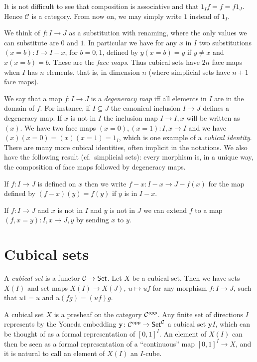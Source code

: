 \documentclass[10pt,a4paper]{article}
\newcommand{\CC}{{\mathcal C}}
\newcommand{\yoneda}{\mathbf{y}}
\begin{document}
It is not difficult to see that composition is associative and that $1_I f = f = f 1_J$.
Hence $\CC$ is a category. From now on, we may simply write $1$ instead of $1_I$.

 We think of $f:I\to J$ as a substitution with renaming,
 where the only values we can substitute are $0$ and $1$.
In particular we have for any $x$ in $I$ two substitutions $(x=b):I\to I-x$, for $b=0,1$,
defined by $y(x=b) = y$ if $y\neq x$ and $x(x=b) = b$. These are the \emph{face maps}.
Thus cubical sets have $2n$ face maps when $I$ has $n$ elements, that is, in dimension $n$
(where simplicial sets have $n+1$ face maps).

 We say that a map $f:I\to J$ is a {\em degeneracy map} iff all elements in $I$ are in
the domain of $f$. For instance, if $I\subseteq J$ the canonical inclusion $I \to J$ defines
a degeneracy map. If $x$ is not in $I$ the inclusion map $I \to I,x$ will be written as $(x)$.
We have two face maps $(x=0), (x=1):I,x\to I$ and we
have $(x)(x=0) = (x)(x=1) = 1_I$, which is one example of a \emph{cubical identity}.
There are many more cubical identities, often implicit in the notations. We also have
the following result (cf.\ simplicial sets): every morphism is, in a unique way, the composition of
face maps followed by degeneracy maps.

 If $f:I\to J$ is defined on $x$ then we write $f-x:I-x \to J-{f(x)}$ for the map defined by
$(f-x)(y) = f(y)$ if $y$ is in $I-x.$

 If $f:I\to J$ and $x$ is not in $I$ and $y$ is not in $J$ we can extend $f$ to a map
$(f,x=y):I,x\to J,y$ by sending $x$ to $y$.

\section{Cubical sets}

A \emph{cubical set} is a functor $\CC\to{\sf Set}$.
Let $X$ be a cubical set. Then we have sets $X(I)$ and set maps
$X(I)\to X(J),~u\longmapsto uf$ for any morphism $f:I\to J$,
such that $u1 = u$ and $u(fg) = (uf)g$.

\medskip

A cubical set $X$ is a presheaf on the category ${\cal C}^{opp}$. Any
finite set of directions $I$ represents by the Yoneda embedding
$\yoneda \colon {\cal C}^{opp} \to {\sf Set}^{\cal C}$ a cubical set
$\yoneda I$, which can be thought of as a formal representation of
$[0,1]^I$.  An element of $X(I)$ can then be seen as a formal
representation of a ``continuous'' map $[0,1]^I\to X$, and it is
natural to call an element of $X(I)$ an $I$-cube.
\end{document}
